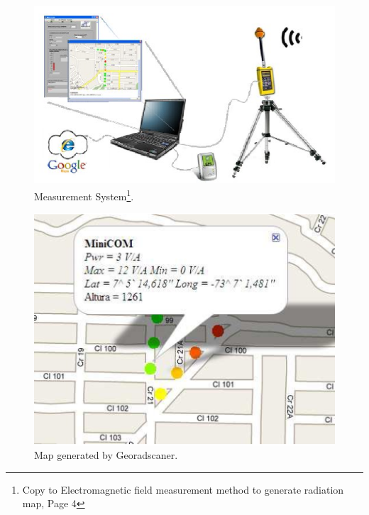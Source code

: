 \documentclass[xcolor=svgnames]{beamer}
\begin{document}
\begin{frame}
 \begin{figure}[H]
    \includegraphics[scale=0.38]{trasns.png}
      \caption{Measurement System\footnote{Copy to Electromagnetic field measurement method to generate radiation map, Page 4}.}
    \end{figure}
\end{frame}

\begin{frame}
 \begin{figure}[H]
    \includegraphics[scale=0.295]{map.png}
      \caption{Map generated by Georadscaner.}
    \end{figure}
\end{frame}
\end{document}

